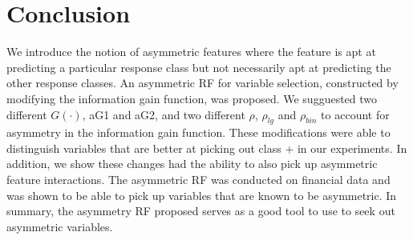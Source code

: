 \documentclass[twoside,11pt]{article}
\begin{document}
\section{Conclusion}
We introduce the notion of asymmetric features where the feature is apt at predicting a particular response class but not necessarily apt at predicting the other response classes. An asymmetric RF for variable selection, constructed by modifying the information gain function, was proposed. We sugguested two different $G(\cdot)$, aG1 and aG2, and two different $\rho$, $\rho_{lg}$ and $\rho_{bin}$ to account for asymmetry in the information gain function. These modifications were able to distinguish variables that are better at picking out class + in our experiments. In addition, we show these changes had the ability to also pick up asymmetric feature interactions. The asymmetric RF was conducted on financial data and was shown to be able to pick up variables that are known to be asymmetric. In summary, the asymmetry RF proposed serves as a good tool to use to seek out asymmetric variables. 


\end{document}
